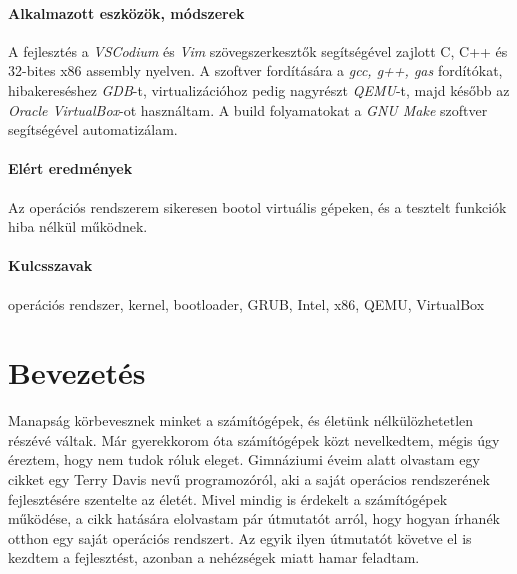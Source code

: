 \documentclass[12pt,numbers=noenddot]{report}
\begin{document}
\subsubsection*{Alkalmazott eszközök, módszerek}

A fejlesztés a \textit{VSCodium} és \textit{Vim} szövegszerkesztők segítségével
zajlott C, C++ és 32-bites x86 assembly nyelven.
A szoftver fordítására a \textit{gcc, g++, gas} fordítókat, hibakereséshez
\textit{GDB}-t, virtualizációhoz pedig nagyrészt \textit{QEMU}-t, majd később az
\textit{Oracle VirtualBox}-ot használtam. A build folyamatokat a
\textit{GNU Make} szoftver segítségével automatizálam.

\subsubsection*{Elért eredmények}

Az operációs rendszerem sikeresen bootol virtuális gépeken, és a tesztelt
funkciók hiba nélkül működnek.

\subsubsection*{Kulcsszavak}

operációs rendszer, kernel, bootloader, GRUB, Intel, x86, QEMU, VirtualBox


\renewcommand{\contentsname}{Tartalomjegyzék}
\tableofcontents


\chapter*{Bevezetés}
\pagestyle{fancy}

Manapság körbevesznek minket a számítógépek, és életünk nélkülözhetetlen részévé
váltak. Már gyerekkorom óta számítógépek közt nevelkedtem, mégis úgy éreztem,
hogy nem tudok róluk eleget. Gimnáziumi éveim alatt olvastam egy cikket egy
Terry Davis nevű programozóról, aki a saját operácios rendszerének
fejlesztésére szentelte az életét. Mivel mindig is érdekelt a számítógépek
működése, a cikk hatására elolvastam pár útmutatót arról, hogy hogyan írhanék
otthon egy saját operációs rendszert. Az egyik ilyen útmutatót követve el is
kezdtem a fejlesztést, azonban a nehézségek miatt hamar feladtam.
\end{document}
